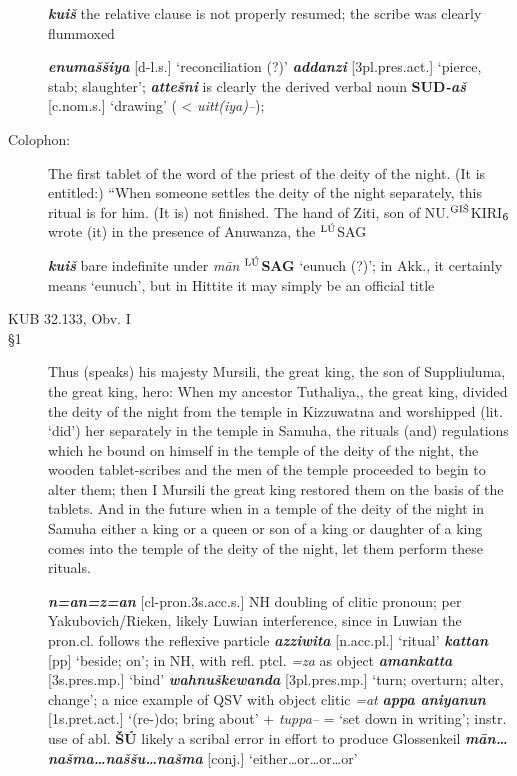 \documentclass[10pt]{article}
\newcommand{\supersc}[1]{$^{\textrm{\scriptsize{#1}}}$}  	%
\newcommand{\subsc}[1]{$_{\textrm{\scriptsize{#1}}}$}	%
\newcommand{\bit}[1]{\textbf{\textit{#1}}}				%
\newcommand{\p}[1]{{\tiny[{#1}]}}					%
\newcommand{\hith}{\textsubwedge{h}}
\renewcommand{\.}[1]{\textsubdot{#1}}
\begin{document}
\begin{description}
\begin{notes}
\bit{kui\v{s}} the relative clause is not properly resumed; the scribe was clearly flummoxed 

\bit{enuma\v{s}\v{s}iya} \p{d-l.s.} `reconciliation (?)' \bit{{\hith}addanzi} \p{3pl.pres.act.} `pierce, stab; slaughter'; \bit{{\hith}atte\v{s}ni} is clearly the derived verbal noun \textbf{SUD}\bit{-a\v{s}} \p{c.nom.s.} `drawing' ( < \textit{{\hith}uitt(iya)--});  

\end{notes}



\item[Colophon:] The first tablet of the word of the priest of the deity of the night. (It is entitled:) ``When someone settles the deity of the night separately, this ritual is for him. (It is) not finished. The hand of Ziti, son of NU.\supersc{GI\v{S}}KIRI\subsc{6} wrote (it) in the presence of Anuwanza, the \supersc{L\'U}SAG


\begin{notes}

\bit{kui\v{s}} bare indefinite under \textit{m\=an} \textbf{\supersc{L\'U}SAG} `eunuch (?)'; in Akk., it certainly means `eunuch', but in Hittite it may simply be an official title


\end{notes}

\bigskip
\item[KUB 32.133, Obv. I]
\bigskip

\item[\S1] Thus (speaks) his majesty Mursili, the great king, the son of Suppliuluma, the great king, hero: When my ancestor Tuthaliya,, the great king, divided the deity of the night from the temple in Kizzuwatna and worshipped (lit. `did') her separately in the temple in Samuha, the rituals (and) regulations which he bound on himself in the temple of the deity of the night, the wooden tablet-scribes and the men of the temple proceeded to begin to alter them; then I Mursili the great king restored them on the basis of the tablets. And in the future when in a temple of the deity of the night in Samuha either a king or a queen or son of a king or daughter of a king comes into the temple of the deity of the night, let them perform these rituals.


\begin{notes}

\bit{n=an=z=an} \p{cl-pron.3s.acc.s.} NH doubling of clitic pronoun; per Yakubovich/Rieken, likely Luwian interference, since in Luwian the pron.cl. follows the reflexive particle \bit{{\hith}azziwita} \p{n.acc.pl.} `ritual'  \bit{kattan} \p{pp} `beside; on'; in NH, with refl. ptcl. \textit{=za} as object \bit{{\hith}amankatta} \p{3s.pres.mp.} `bind' \bit{wahnu\v{s}kewanda} \p{3pl.pres.mp.} `turn; overturn; alter, change'; a nice example of QSV with object clitic \textit{=at}  \bit{appa aniyanun} \p{1s.pret.act.} `(re-)do; bring about' + \textit{tuppa--} = `set down in writing'; instr. use of abl. \textbf{\v{S}\'U} likely a scribal error in effort to produce Glossenkeil \bit{m\=an{\ldots}na\v{s}ma{\ldots}na\v{s}\v{s}u{\ldots}na\v{s}ma} \p{conj.} `either{\ldots}or{\ldots}or{\ldots}or' 
 

\end{notes}
\end{description}
\end{document}
